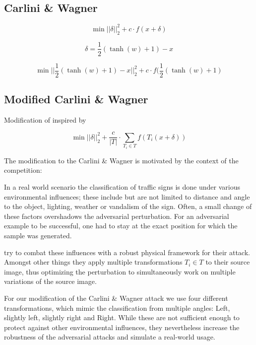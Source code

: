 \subsection{Carlini \& Wagner}

\citet{carlini2017towards}

\begin{equation}
\min ||\delta||^2_2 + c \cdot f(x + \delta)
\end{equation}

\begin{equation}
\delta = \frac{1}{2}(\tanh(w)+1) - x
\end{equation}

\begin{equation}
\min ||\frac{1}{2}(\tanh(w)+1)-x||^2_2 + c \cdot f(\frac{1}{2}(\tanh(w)+1)
\end{equation}

\subsection{Modified Carlini \& Wagner}

Modification of \cite{carlini2017towards} inspired by \cite{eykholt2018robust}

\begin{equation}
\min ||\delta||^2_2 + \frac{c}{|T|} \cdot \sum_{T_i \in T} f(T_i(x + \delta))
\end{equation}

The modification to the Carlini \& Wagner is motivated by the context of the competition:

In a real world scenario the classification of traffic signs is done under various environmental influences;
these include but are not limited to distance and angle to the object, lighting, weather or vandalism of the sign.
Often, a small change of these factors overshadows the adversarial perturbation. %
For an adversarial example to be successful, one had to stay at the exact position for which the sample was generated. 

\citet{eykholt2018robust} try to combat these influences with a robust physical framework for their attack.
Amongst other things they apply multiple transformations $T_i \in T$ to their source image,
thus optimizing the perturbation to simultaneously work on multiple variations of the source image.

For our modification of the Carlini \& Wagner attack we use four different transformations,
which mimic the classification from multiple angles: Left, slightly left, slightly right and Right.
While these are not sufficient enough to protect against other environmental influences,
they nevertheless increase the robustness of the adversarial attacks and simulate a real-world usage.

